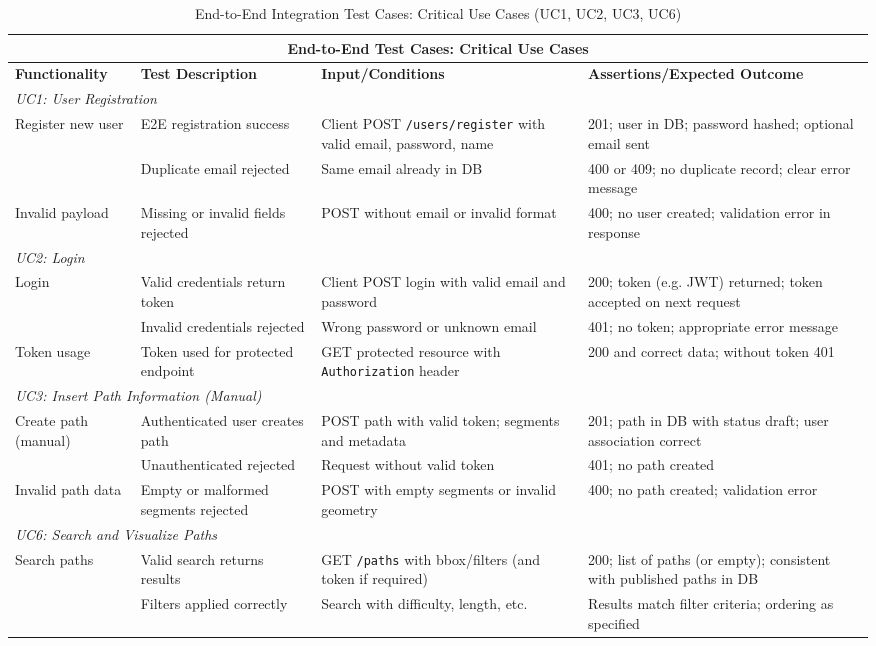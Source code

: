\begin{table}[ht]
\centering
\begin{tabular}{|p{2.4cm}|p{3.4cm}|p{3cm}|p{5.2cm}|}
\hline
\multicolumn{4}{|c|}{\textbf{End-to-End Test Cases: Critical Use Cases}} \\ 
\hline
\textbf{Functionality} & \textbf{Test Description} & \textbf{Input/Conditions} & \textbf{Assertions/Expected Outcome} \\
\hline
\multicolumn{4}{|l|}{\textit{UC1: User Registration}} \\
\hline
\multirow{2}{*}{Register new user}
 & E2E registration success
 & Client POST \texttt{/users/register} with valid email, password, name
 & 201; user in DB; password hashed; optional email sent \\ \cline{2-4}
 & Duplicate email rejected
 & Same email already in DB
 & 400 or 409; no duplicate record; clear error message \\
\hline
Invalid payload
 & Missing or invalid fields rejected
 & POST without email or invalid format
 & 400; no user created; validation error in response \\
\hline
\multicolumn{4}{|l|}{\textit{UC2: Login}} \\
\hline
\multirow{2}{*}{Login}
 & Valid credentials return token
 & Client POST login with valid email and password
 & 200; token (e.g. JWT) returned; token accepted on next request \\ \cline{2-4}
 & Invalid credentials rejected
 & Wrong password or unknown email
 & 401; no token; appropriate error message \\
\hline
Token usage
 & Token used for protected endpoint
 & GET protected resource with \texttt{Authorization} header
 & 200 and correct data; without token 401 \\
\hline
\multicolumn{4}{|l|}{\textit{UC3: Insert Path Information (Manual)}} \\
\hline
\multirow{2}{*}{Create path (manual)}
 & Authenticated user creates path
 & POST path with valid token; segments and metadata
 & 201; path in DB with status draft; user association correct \\ \cline{2-4}
 & Unauthenticated rejected
 & Request without valid token
 & 401; no path created \\
\hline
Invalid path data
 & Empty or malformed segments rejected
 & POST with empty segments or invalid geometry
 & 400; no path created; validation error \\
\hline
\multicolumn{4}{|l|}{\textit{UC6: Search and Visualize Paths}} \\
\hline
\multirow{2}{*}{Search paths}
 & Valid search returns results
 & GET \texttt{/paths} with bbox/filters (and token if required)
 & 200; list of paths (or empty); consistent with published paths in DB \\ \cline{2-4}
 & Filters applied correctly
 & Search with difficulty, length, etc.
 & Results match filter criteria; ordering as specified \\
\hline
\end{tabular}
\caption{End-to-End Integration Test Cases: Critical Use Cases (UC1, UC2, UC3, UC6)}
\label{tab:test_cases_e2e_critical}
\end{table}

